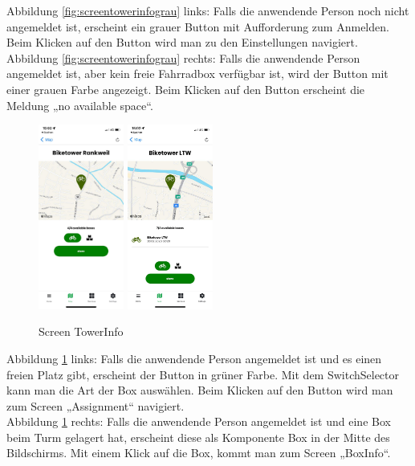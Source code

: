 Abbildung \ref{fig:screentowerinfograu} links: Falls die anwendende Person noch nicht angemeldet ist, erscheint ein grauer Button mit Aufforderung zum Anmelden. Beim Klicken auf den Button wird man zu den Einstellungen navigiert.\\
Abbildung \ref{fig:screentowerinfograu} rechts: Falls die anwendende Person angemeldet ist, aber kein freie Fahrradbox verfügbar ist, wird der Button mit einer grauen Farbe angezeigt. Beim Klicken auf den Button erscheint die Meldung „no available space“.\\
\begin{figure}[H]
    \centering
    \includegraphics[width=0.25\textwidth]{images/app-screenshots/screentowerinfoc.png}
    \includegraphics[width=0.25\textwidth]{images/app-screenshots/screentowerinfod.png}
    \caption{Screen TowerInfo}
    \label{fig:screentowerinfo}
\end{figure}
Abbildung \ref{fig:screentowerinfo} links: Falls die anwendende Person angemeldet ist und es einen freien Platz gibt, erscheint der Button in grüner Farbe. Mit dem SwitchSelector kann man die Art der Box auswählen. Beim Klicken auf den Button wird man zum Screen „Assignment“ navigiert.\\
Abbildung \ref{fig:screentowerinfo} rechts: Falls die anwendende Person angemeldet ist und eine Box beim Turm gelagert hat, erscheint diese als Komponente Box in der Mitte des Bildschirms. Mit einem Klick auf die Box, kommt man zum Screen „BoxInfo“.